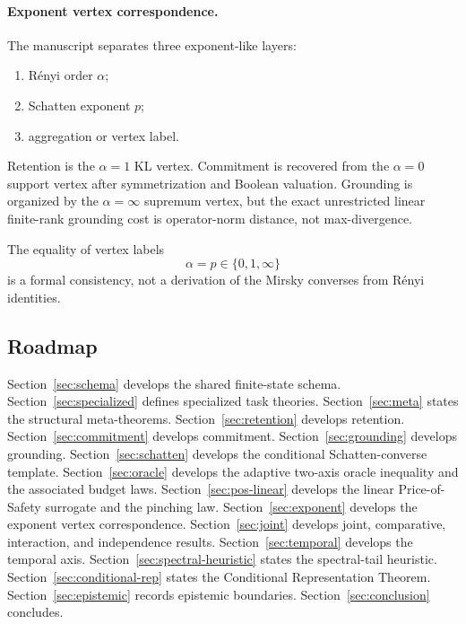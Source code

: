 \documentclass[12pt]{article}
\theoremstyle{definition}
\begin{document}
\paragraph{Exponent vertex correspondence.}
The manuscript separates three exponent-like layers:
\begin{enumerate}[nosep,label=(\arabic*)]
\item R\'enyi order $\alpha$;
\item Schatten exponent $p$;
\item aggregation or vertex label.
\end{enumerate}

Retention is the $\alpha=1$ KL vertex.  Commitment is recovered from the
$\alpha=0$ support vertex after symmetrization and Boolean valuation.
Grounding is organized by the $\alpha=\infty$ supremum vertex, but the exact
unrestricted linear finite-rank grounding cost is operator-norm distance, not
max-divergence.

The equality of vertex labels
\[
\alpha=p\in\{0,1,\infty\}
\]
is a formal consistency, not a derivation of the Mirsky converses from
R\'enyi identities.

\subsection{Roadmap}
\label{subsec:roadmap}

Section~\ref{sec:schema} develops the shared finite-state schema.
Section~\ref{sec:specialized} defines specialized task theories.
Section~\ref{sec:meta} states the structural meta-theorems.
Section~\ref{sec:retention} develops retention.
Section~\ref{sec:commitment} develops commitment.
Section~\ref{sec:grounding} develops grounding.
Section~\ref{sec:schatten} develops the conditional Schatten-converse
template.
Section~\ref{sec:oracle} develops the adaptive two-axis oracle inequality and
the associated budget laws.
Section~\ref{sec:pos-linear} develops the linear Price-of-Safety surrogate and
the pinching law.
Section~\ref{sec:exponent} develops the exponent vertex correspondence.
Section~\ref{sec:joint} develops joint, comparative, interaction, and
independence results.
Section~\ref{sec:temporal} develops the temporal axis.
Section~\ref{sec:spectral-heuristic} states the spectral-tail heuristic.
Section~\ref{sec:conditional-rep} states the Conditional Representation
Theorem.
Section~\ref{sec:epistemic} records epistemic boundaries.
Section~\ref{sec:conclusion} concludes.
\end{document}
